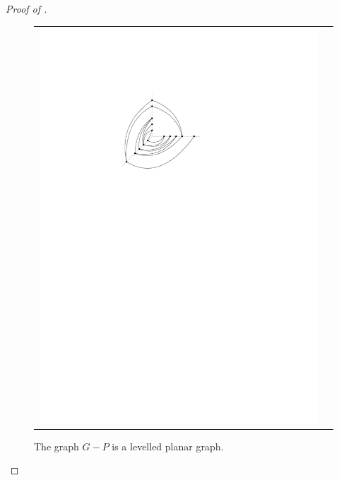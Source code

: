 \documentclass{patmorin}
\begin{document}
\begin{proof}[Proof of ]
\begin{figure}
\begin{center}
\begin{tabular}{cc}
  \includegraphics{figs/graph-3}
  \end{tabular}
  \end{center}
  \caption{The graph $G-P$ is a levelled planar graph.}
  \end{figure}


\end{proof}
\end{document}
